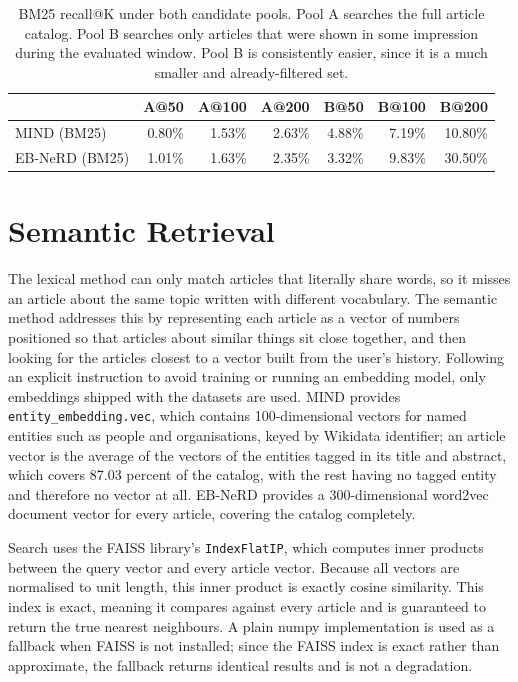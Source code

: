 \documentclass[11pt]{article}
\begin{document}
\begin{table}[t]
\centering
\begin{tabular}{lrrrrrr}
\toprule
 & A@50 & A@100 & A@200 & B@50 & B@100 & B@200 \\
\midrule
MIND (BM25) & 0.80\% & 1.53\% & 2.63\% & 4.88\% & 7.19\% & 10.80\% \\
EB-NeRD (BM25) & 1.01\% & 1.63\% & 2.35\% & 3.32\% & 9.83\% & 30.50\% \\
\bottomrule
\end{tabular}
\caption{BM25 recall@K under both candidate pools. Pool A searches the full article catalog.
Pool B searches only articles that were shown in some impression during the evaluated window.
Pool B is consistently easier, since it is a much smaller and already-filtered set.}
\label{tab:bm25recall}
\end{table}

\section{Semantic Retrieval}
\label{sec:semantic}

The lexical method can only match articles that literally share words, so it misses an article
about the same topic written with different vocabulary. The semantic method addresses this by
representing each article as a vector of numbers positioned so that articles about similar
things sit close together, and then looking for the articles closest to a vector built from the
user's history. Following an explicit instruction to avoid training or running an embedding
model, only embeddings shipped with the datasets are used. MIND provides
\texttt{entity\_embedding.vec}, which contains 100-dimensional vectors for named entities such
as people and organisations, keyed by Wikidata identifier; an article vector is the average of
the vectors of the entities tagged in its title and abstract, which covers 87.03 percent of the
catalog, with the rest having no tagged entity and therefore no vector at all. EB-NeRD provides
a 300-dimensional word2vec document vector for every article, covering the catalog completely.

Search uses the FAISS library's \texttt{IndexFlatIP}, which computes inner products between
the query vector and every article vector. Because all vectors are normalised to unit length,
this inner product is exactly cosine similarity. This index is exact, meaning it compares
against every article and is guaranteed to return the true nearest neighbours. A plain numpy
implementation is used as a fallback when FAISS is not installed; since the FAISS index is
exact rather than approximate, the fallback returns identical results and is not a degradation.
\end{document}

